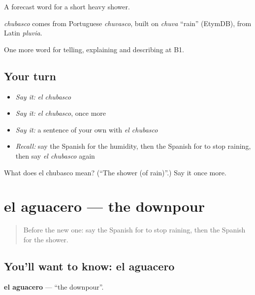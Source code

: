 A forecast word for a short heavy shower.

\begin{cousinweb}
\emph{chubasco} comes from Portuguese \emph{chuvasco}, built on \emph{chuva} \textquotedblleft{}rain\textquotedblright{} (EtymDB), from Latin \emph{pluvia}.
\end{cousinweb}

\begin{grammarlens}[title={What you've built}]
One more word for telling, explaining and describing at B1.
\end{grammarlens}

\subsection*{Your turn}
\begin{itemize}
\raggedright
  \item \emph{Say it:} \emph{el chubasco}
  \item \emph{Say it:} \emph{el chubasco}, once more
  \item \emph{Say it:} a sentence of your own with \emph{el chubasco}
  \item \emph{Recall:} say the Spanish for the humidity, then the Spanish for to stop raining, then say \emph{el chubasco} again
\end{itemize}

\begin{tcolorbox}[breakable,colback=teal!4,colframe=teal!35!black,title={Before you move on}]
What does el chubasco mean? (\textquotedblleft{}The shower (of rain)\textquotedblright{}.) Say it once more.
\end{tcolorbox}
\section[el aguacero]{el aguacero — the downpour}

\label{lesson:ES-C697-aguacero}



\begin{quote}
Before the new one: say the Spanish for to stop raining, then the Spanish for the shower.
\end{quote}

\subsection*{You'll want to know: el aguacero}
\textbf{el aguacero} — \textquotedblleft{}the downpour\textquotedblright{}.

